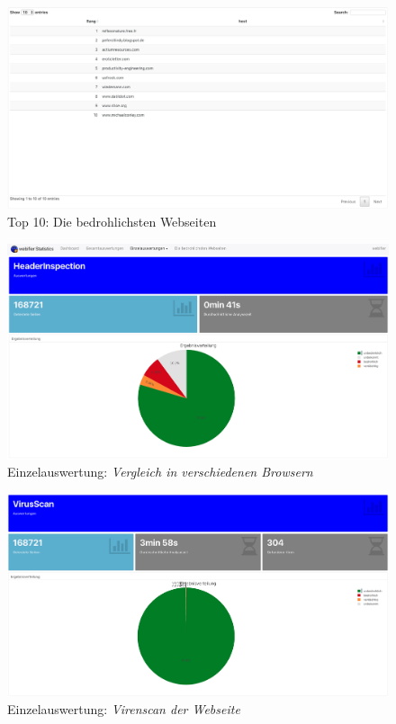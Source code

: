 \begin{landscape}
\begin{figure}[H]
  \centering
  \includegraphics[width=\textheight]{images/stats/top10}
  \caption{Top 10: Die bedrohlichsten Webseiten}
\end{figure}

\begin{figure}[H]
  \centering
  \includegraphics[width=\textheight]{images/stats/headerinspection}
  \caption{Einzelauswertung: \textit{Vergleich in verschiedenen Browsern}}
\end{figure}

\begin{figure}[H]
  \centering
  \includegraphics[width=\textheight]{images/stats/virusscan}
  \caption{Einzelauswertung: \textit{Virenscan der Webseite}}
\end{figure}


\end{landscape}
